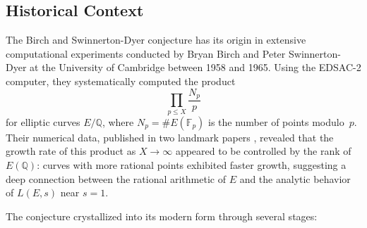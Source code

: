 \documentclass[11pt]{article}
\begin{document}
\subsection*{Historical Context}

The Birch and Swinnerton-Dyer conjecture has its origin in extensive
computational experiments conducted by Bryan Birch and Peter Swinnerton-Dyer at
the University of Cambridge between 1958 and 1965.  Using the EDSAC-2 computer,
they systematically computed the product
\[
  \prod_{p \leq X} \frac{N_p}{p}
\]
for elliptic curves $E/\mathbb{Q}$, where $N_p = \#E(\mathbb{F}_p)$ is the
number of points modulo~$p$.  Their numerical data, published in two landmark
papers \cite{BSD, BSD-I}, revealed that the growth rate of this product as
$X \to \infty$ appeared to be controlled by the rank of $E(\mathbb{Q})$:
curves with more rational points exhibited faster growth, suggesting a deep
connection between the rational arithmetic of $E$ and the analytic behavior of
$L(E,s)$ near $s = 1$.

The conjecture crystallized into its modern form through several stages:
\end{document}
